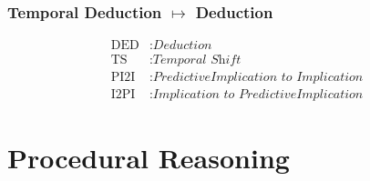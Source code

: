 \documentclass[aspectratio=169]{beamer}
\begin{document}
\begin{frame}
  \frametitle{Temporal Deduction $\mapsto$ Deduction}
  {\small
    \begin{prooftree}
    \end{prooftree}}

  {\small
  \begin{align*}
  \text{DED}  &: \textit{Deduction} \\
  \text{TS}   &: \textit{Temporal Shift} \\
  \text{PI2I} &: \textit{PredictiveImplication to Implication} \\
  \text{I2PI} &: \textit{Implication to PredictiveImplication}
  \end{align*}
  }

\end{frame}

\section{Procedural Reasoning}
\end{document}
